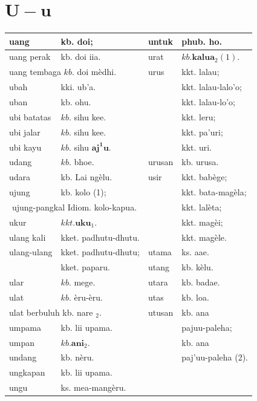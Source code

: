 \documentclass[10pt]{article}
\begin{document}
\section*{\(\mathbf{U}-\mathbf{u}\)}
\begin{center}
\begin{tabular}{|l|l|l|l|}
\hline
uang & kb. doi; & untuk & phub. ho. \\
\hline
uang perak & kb. doi iia. & urat & \(k b . \mathbf{k a l u a}_{2}(1)\). \\
\hline
\multicolumn{2}{|l|}{uang tembaga \(k b\). doi mèdhi.} & urus & kkt. lalau; \\
\hline
ubah & kki. ub'a. &  & kkt. lalau-lalo'o; \\
\hline
uban & kb. ohu. &  & kkt. lalau-lo'o; \\
\hline
ubi batatas & \(k b\). sihu kee. &  & kkt. leru; \\
\hline
ubi jalar & \(k b\). sihu kee. &  & kkt. pa'uri; \\
\hline
ubi kayu & \(k b\). sihu \(\mathbf{a j}^{\mathbf{1}} \mathbf{u}\). &  & kkt. uri. \\
\hline
udang & \(k b\). bhoe. & urusan & kb. urusa. \\
\hline
udara & kb. Lai ngèlu. & usir & kkt. babège; \\
\hline
ujung & kb. kolo (1); &  & kkt. bata-magèla; \\
\hline
\multicolumn{2}{|c|}{ujung-pangkal Idiom. kolo-kapua.} &  & kkt. lalèta; \\
\hline
ukur & \(k k t . \mathbf{u k u}_{1}\). &  & kkt. magèi; \\
\hline
ulang kali & kket. padhutu-dhutu. &  & kkt. magèle. \\
\hline
ulang-ulang & kket. padhutu-dhutu; & utama & ks. aae. \\
\hline
 & kket. paparu. & utang & kb. kèlu. \\
\hline
ular & \(k b\). mege. & utara & kb. badae. \\
\hline
ulat & \(k b\). èru-èru. & utas & kb. loa. \\
\hline
\multicolumn{2}{|l|}{ulat berbuluh kb. nare \({ }_{2}\).} & utusan & kb. ana \\
\hline
umpama & kb. lii upama. &  & pajuu-paleha; \\
\hline
umpan & \(k b . \mathbf{a n i}_{2}\). &  & kb. ana \\
\hline
undang & kb. nèru. &  & paj'uu-paleha (2). \\
\hline
ungkapan & kb. lii upama. &  &  \\
\hline
ungu & ks. mea-mangèru. &  &  \\
\hline
\end{tabular}
\end{center}
\end{document}
